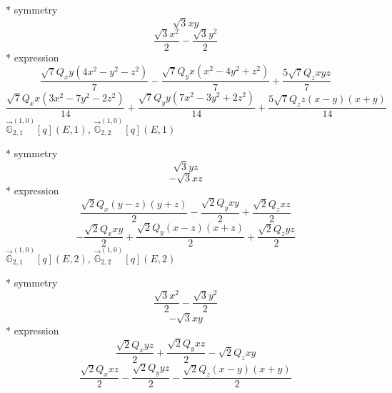\documentclass[fleqn,8pt]{jsarticle}
\begin{document}
\noindent\quad ** symmetry
\begin{dmath*}
\sqrt{3} x y
\end{dmath*}
\begin{dmath*}
\frac{\sqrt{3} x^{2}}{2} - \frac{\sqrt{3} y^{2}}{2}
\end{dmath*}
\noindent\quad ** expression
\begin{dmath*}
\frac{\sqrt{7} Q_{x} y \left(4 x^{2} - y^{2} - z^{2}\right)}{7} - \frac{\sqrt{7} Q_{y} x \left(x^{2} - 4 y^{2} + z^{2}\right)}{7} + \frac{5 \sqrt{7} Q_{z} x y z}{7}
\end{dmath*}
\begin{dmath*}
\frac{\sqrt{7} Q_{x} x \left(3 x^{2} - 7 y^{2} - 2 z^{2}\right)}{14} + \frac{\sqrt{7} Q_{y} y \left(7 x^{2} - 3 y^{2} + 2 z^{2}\right)}{14} + \frac{5 \sqrt{7} Q_{z} z \left(x - y\right) \left(x + y\right)}{14}
\end{dmath*}
\noindent\quad $\vec{\mathbb{G}}_{2,1}^{(1,0)}[q](E,1)$, $\vec{\mathbb{G}}_{2,2}^{(1,0)}[q](E,1)$

\noindent\quad ** symmetry
\begin{dmath*}
\sqrt{3} y z
\end{dmath*}
\begin{dmath*}
- \sqrt{3} x z
\end{dmath*}
\noindent\quad ** expression
\begin{dmath*}
\frac{\sqrt{2} Q_{x} \left(y - z\right) \left(y + z\right)}{2} - \frac{\sqrt{2} Q_{y} x y}{2} + \frac{\sqrt{2} Q_{z} x z}{2}
\end{dmath*}
\begin{dmath*}
- \frac{\sqrt{2} Q_{x} x y}{2} + \frac{\sqrt{2} Q_{y} \left(x - z\right) \left(x + z\right)}{2} + \frac{\sqrt{2} Q_{z} y z}{2}
\end{dmath*}
\noindent\quad $\vec{\mathbb{G}}_{2,1}^{(1,0)}[q](E,2)$, $\vec{\mathbb{G}}_{2,2}^{(1,0)}[q](E,2)$

\noindent\quad ** symmetry
\begin{dmath*}
\frac{\sqrt{3} x^{2}}{2} - \frac{\sqrt{3} y^{2}}{2}
\end{dmath*}
\begin{dmath*}
- \sqrt{3} x y
\end{dmath*}
\noindent\quad ** expression
\begin{dmath*}
\frac{\sqrt{2} Q_{x} y z}{2} + \frac{\sqrt{2} Q_{y} x z}{2} - \sqrt{2} Q_{z} x y
\end{dmath*}
\begin{dmath*}
\frac{\sqrt{2} Q_{x} x z}{2} - \frac{\sqrt{2} Q_{y} y z}{2} - \frac{\sqrt{2} Q_{z} \left(x - y\right) \left(x + y\right)}{2}
\end{dmath*}
\end{document}
